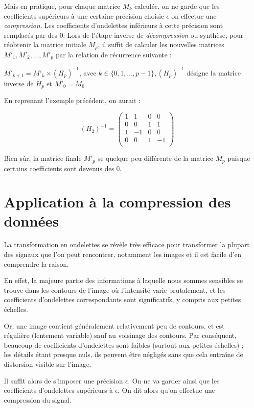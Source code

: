 \documentclass{article}
\begin{document}
Mais en pratique, pour chaque matrice $M_k$ calculée, on ne garde que les coefficients supérieurs à une certaine précision choisie $\epsilon$ on effectue une \emph{compression}. Les coefficients d’ondelettes inférieurs à cette précision sont remplacés par des 0.
Lors de l’étape inverse de \emph{décompression} ou synthèse, pour réobtenir la matrice initiale $M_p$, il suffit de calculer les nouvelles matrices $M'_1,M'_2,…,M'_p$ par la relation de récurrence suivante :

$M'_{k+1} = M'_{k} \times (H_{p})^{-1}$, avec $k \in \{0,1,\dots{},p-1\}, (H_p)^{-1}$ désigne la matrice inverse de $H_p$ et $M'_0 = M_0$


En reprenant l’exemple précédent, on aurait :

\[ (H_2)^{-1} = \begin{pmatrix}
1 & 1 & 0 & 0 \\
0 & 0 & 1 & 1 \\
1 & -1 & 0 & 0 \\
0 & 0 & 1 & -1 \\
\end{pmatrix} 
\]

Bien sûr, la matrice finale $M'_p$ se quelque peu différente de la matrice $M_p$ puisque certains coefficients sont devenus des 0.


\section{Application à la compression des données}

La transformation en ondelettes se révèle très efficace pour transformer la plupart des signaux que l'on peut rencontrer, notamment les images et il est facile d'en comprendre la raison. 

En effet, la majeure partie des informations à laquelle nous sommes sensibles se trouve dans les contours de l'image où l'intensité varie brutalement, et les coefficients d'ondelettes correspondants sont significatifs, y compris aux petites échelles. 

Or, une image contient généralement relativement peu de contours, et est régulière (lentement variable) sauf au voisinage des contours. Par conséquent, beaucoup de coefficients d'ondelettes sont faibles (surtout aux petites échelles) ; les détails étant presque nuls, ils peuvent être négligés sans que cela entraîne de distorsion visible sur l'image. 

Il suffit alors de s’imposer une précision $\epsilon$. On ne va garder ainsi que les coefficients d’ondelettes supérieurs à $\epsilon$. On dit alors qu’on effectue une compression du signal.
\end{document}
